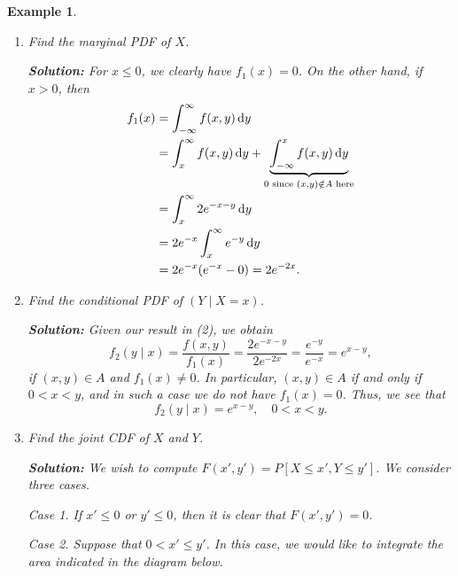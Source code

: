 \documentclass[10pt]{article}
\theoremstyle{newstyle}
\newtheorem{exmp}[thm]{Example}
\begin{document}
\begin{exmp}
\begin{enumerate}[(1)]
    \item Find the marginal PDF of $X$. 
    
    {\color{blue}
    {\bf Solution:} For $x \leq 0$, we clearly have $f_1(x) = 0$. On the other hand, if 
    $x > 0$, then 
    \begin{align*}
        f_1(x) &= \int_{-\infty}^\infty f(x,y)\,{\rm d}y \\
        &= \int_x^\infty f(x, y)\,{\rm d}y + \underbrace{\int_{-\infty}^x f(x, y)\,{\rm d}y}_{0 
        \text{ since } (x, y) \notin A \text{ here}} \\
        &= \int_x^\infty 2e^{-x-y}\,{\rm d}y \\ &= 2e^{-x} \int_x^\infty e^{-y}\,{\rm d}y \\
        &= 2e^{-x} (e^{-x} - 0) = 2e^{-2x}.
    \end{align*}
    }
    
    \item Find the conditional PDF of $(Y \mid X = x)$. 
    
    {\color{blue}
    {\bf Solution:} Given our result in (2), we obtain 
    \[ f_2(y \mid x) = \frac{f(x,y)}{f_1(x)} = \frac{2e^{-x-y}}{2e^{-2x}} = \frac{e^{-y}}{e^{-x}} 
    = e^{x-y}, \] 
    if $(x, y) \in A$ and $f_1(x) \neq 0$. In particular, $(x, y) \in A$ if and only if 
    $0 < x < y$, and in such a case we do not have $f_1(x) = 0$. Thus, we see that 
    \[ f_2(y \mid x) = e^{x-y}, \quad 0 < x < y. \]}

    \item Find the joint CDF of $X$ and $Y$.
    
    {\color{blue}
    {\bf Solution:} We wish to compute $F(x', y') = P[X \leq x', Y \leq y']$. 
    We consider three cases.
    
    {\sc Case 1.} If $x' \leq 0$ or $y' \leq 0$, then it is clear that $F(x', y') = 0$.
    
    {\sc Case 2.} Suppose that $0 < x' \leq y'$. In this case, we would like to 
    integrate the area indicated in the diagram below.
    }
    
    \begin{center}
        
    


\begin{tikzpicture}[x=0.75pt,y=0.75pt,yscale=-1,xscale=1]


\end{tikzpicture}
\end{center}
\end{enumerate}
\end{exmp}
\end{document}
